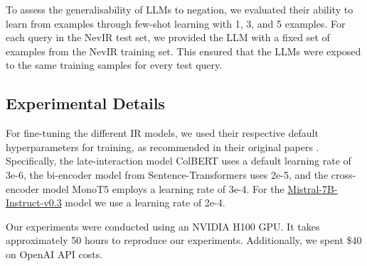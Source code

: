 To assess the generalisability of LLMs to negation, we evaluated their ability to learn from examples through few-shot learning with 1, 3, and 5 examples. For each query in the NevIR test set, we provided the LLM with a fixed set of examples from the NevIR training set. This ensured that the LLMs were exposed to the same training samples for every test query.





\subsection{Experimental Details}

For fine-tuning the different IR models, we used their respective default hyperparameters for training, as recommended in their original papers \cite{colbertv1, nogueira-etal-2020-document, reimers-gurevych-2019-sentence}. Specifically, the late-interaction model ColBERT uses a default learning rate of 3e-6, the bi-encoder model from Sentence-Transformers uses 2e-5, and the cross-encoder model MonoT5 employs a learning rate of 3e-4. For the \url{Mistral-7B-Instruct-v0.3} model we use a learning rate of 2e-4.

Our experiments were conducted using an NVIDIA H100 GPU. It takes approximately 50 hours to reproduce our experiments. Additionally, we spent \$40 on OpenAI API costs.
